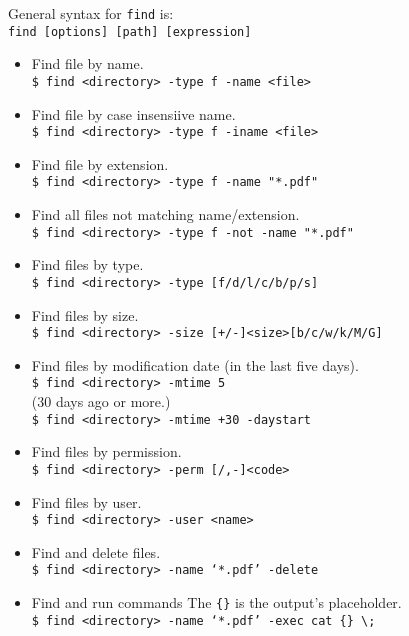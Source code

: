 General syntax for {\tt find} is:\\
{\tt find [options] [path] [expression]}

\begin{itemize}[label={-}, leftmargin=*]

    \item Find file by name.\\
    {\tt \$ find <directory> -type f -name <file>}
    
    \item Find file by case insensiive name.\\
    {\tt \$ find <directory> -type f -iname <file>}
    
    \item Find file by extension.\\
    {\tt \$ find <directory> -type f -name "*.pdf"}
    
    \item Find all files not matching name/extension.\\
    {\tt \$ find <directory> -type f -not -name "*.pdf"}
    
    \item Find files by type.\\
    {\tt \$ find <directory> -type [f/d/l/c/b/p/s]}
    
    \item Find files by size.\\
    {\tt \$ find <directory> -size [+/-]<size>[b/c/w/k/M/G]}
    
    \item Find files by modification date (in the last five days).\\
    {\tt \$ find <directory> -mtime 5}\\
    (30 days ago or more.)\\
    {\tt \$ find <directory> -mtime +30 -daystart}
    
    \item Find files by permission.\\
    {\tt \$ find <directory> -perm [/,-]<code>}
    
    \item Find files by user.\\
    {\tt \$ find <directory> -user <name>}
    
    \item Find and delete files.\\
    {\tt \$ find <directory> -name `*.pdf' -delete}
    
    \item Find and run commands The {\tt\{\}} is the output's placeholder.\\
    {\tt \$ find <directory> -name `*.pdf' -exec cat \{\} \textbackslash;}
    
    
    
    
    
    
\end{itemize}    

